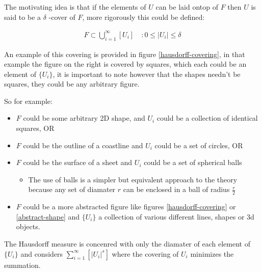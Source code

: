 \documentclass[11pt]{article}
\begin{document}
The motivating idea is that if the elements of \(U\) can be laid ontop of
\(F\) then \(U\) is said to be a \(\delta\) -cover of \(F\), more rigorously this could be defined:

\begin{align}
    F \subset \bigcup^\infty_{i=1} \left[ U_i \right] \quad : 0 \leq \left\lvert U_i \right\rvert \leq \delta \label{eq:hausdorff-covering}
\end{align}

An example of this covering is provided in figure \ref{hausdorff-covering}, in that example the figure on the right is covered by squares, which each could be an element of \(\{U_{i}\}\), it is important to note however that the shapes needn't be squares, they could be any arbitrary figure.

So for example:

\begin{itemize}
\item \(F\) could be some arbitrary 2D shape, and \(U_{i}\) could be
a collection of identical squares, OR

\item \(F\) could be the outline of a coastline and \(U_{i}\) could be a set of circles, OR

\item \(F\) could be the surface of a sheet and \(U_{i}\) could be a set of spherical balls

\begin{itemize}
\item The use of balls is a simpler but equivalent approach to the theory \cite[ ]{falconerFractalGeometryMathematical2003b} because any set of diamater \(r\) can be enclosed in a ball of radius \(\frac{r}{2}\) \cite[p. 166]{edgarMeasureTopologyFractal2008}
\end{itemize}

\item \(F\) could be a more abstracted figure like figures \ref{hausdorff-covering} or \ref{abstract-shape}  and \(\{U_{i}\}\) a collection of various different lines, shapes or 3d objects.
\end{itemize}

The Hausdorff measure is concenred with only the diamater of each element of \(\{U_{i}\}\) and considers \(\sum^{\infty}_{i=1} \left[\left\lvert U_{i}\right\rvert^{s}\right]\) where the covering of \(U_{i}\) minimizes the summation.  \cite[p. 27]{falconerFractalGeometryMathematical2003b}
\end{document}
